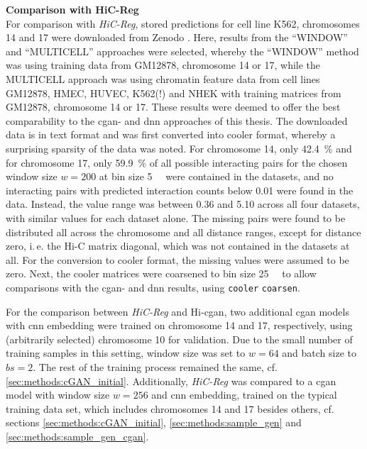 \textbf{Comparison with HiC-Reg}\\
For comparison with \emph{HiC-Reg}, stored predictions for cell line K562, chromosomes 14 and 17 were downloaded from Zenodo \cite{ShiluZhang2019,ShiluZhang2019a}.
Here, results from the ``WINDOW'' and ``MULTICELL'' approaches were selected, whereby the ``WINDOW'' method was using training data from GM12878, chromosome 14 or 17, 
while the MULTICELL approach was using chromatin feature data from cell lines GM12878, HMEC, HUVEC, K562(!) and NHEK with training matrices from GM12878, chromosome 14 or 17.
These results were deemed to offer the best comparability to the \acrshort{cgan}- and \acrshort{dnn} approaches of this thesis.
The downloaded data is in text format and was first converted into cooler format, whereby a surprising sparsity of the data was noted.
For chromosome 14, only \SI{42.4}{\percent} and for chromosome 17, only \SI{59.9}{\percent} of all possible interacting pairs 
for the chosen window size $w=200$ at bin size \SI{5}{\kilo\bp} were contained in the datasets, 
and no interacting pairs with predicted interaction counts below 0.01 were found in the data. 
Instead, the value range was between 0.36 and 5.10 across all four datasets, with similar values for each dataset alone.
The missing pairs were found to be distributed all across the chromosome and all distance ranges, except for distance zero, i.\,e. the Hi-C matrix diagonal, which was not contained in the datasets at all.
For the conversion to cooler format, the missing values were assumed to be zero.
Next, the cooler matrices were coarsened to bin size \SI{25}{\kilo\bp} to allow comparisons with the \acrshort{cgan}- and \acrshort{dnn} results, using \texttt{cooler} \texttt{coarsen}.

For the comparison between \emph{HiC-Reg} and Hi-\acrshort{cgan}, two additional \acrshort{cgan} models with \acrshort{cnn} embedding were trained on chromosome 14 and 17, respectively,
using (arbitrarily selected) chromosome 10 for validation. 
Due to the small number of training samples in this setting, window size was set to $w=64$ and batch size to $bs=2$.
The rest of the training process remained the same, cf. \cref{sec:methods:cGAN_initial}.
Additionally, \emph{HiC-Reg} was compared to a \acrshort{cgan} model with window size $w=256$ and \acrshort{cnn} embedding, trained on the typical training data set, 
which includes chromosomes 14 and 17 besides others, cf. sections \ref{sec:methods:cGAN_initial}, \ref{sec:methods:sample_gen} and \ref{sec:methods:sample_gen_cgan}.

